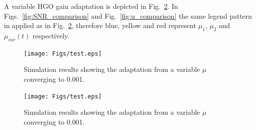 \documentclass[letterpaper, 10 pt, conference]{ieeeconf}  %
\theoremstyle{plain}
\theoremstyle{definition}
\theoremstyle{remark}
\begin{document}

A variable HGO gain adaptation is depicted in Fig.~\ref{fig:mu_comparison}. In Figs.~\ref{fig:SNR_comparison} and Fig.~\ref{fig:u_comparison} the same legend pattern in applied as in Fig.~\ref{fig:mu_comparison}, therefore blue, yellow and red represent $\mu_{1}$, $\mu_{2}$ and $\mu_{var}(t)$ respectively.

%
\begin{figure}[]
	\begin{center}
	\texttt{[image: Figs/test.eps]}
	\caption{Simulation results showing the adaptation from a variable $\mu$ converging to 0.001.}
	\label{fig:mu_comparison}
	\end{center}
\end{figure}
%
%
\begin{figure}[]
	\begin{center}
	\texttt{[image: Figs/test.eps]}
	\caption{Simulation results showing the adaptation from a variable $\mu$ converging to 0.001.}
	\label{fig:mu_comparison}
	\end{center}
\end{figure}
%

\end{document}
